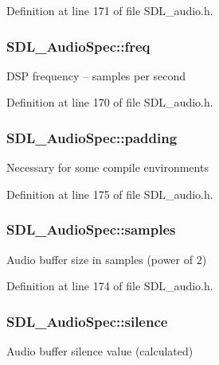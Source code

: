 Definition at line 171 of file S\-D\-L\-\_\-audio.\-h.

\hypertarget{struct_s_d_l___audio_spec_a8b823ce46fc2e448cf7e6fc141aff6b2}{
\subsubsection[{freq}]{ S\-D\-L\-\_\-\-Audio\-Spec\-::freq}}\label{struct_s_d_l___audio_spec_a8b823ce46fc2e448cf7e6fc141aff6b2}
D\-S\-P frequency -- samples per second 

Definition at line 170 of file S\-D\-L\-\_\-audio.\-h.

\hypertarget{struct_s_d_l___audio_spec_a738371fc13b54cefef4db16994abeeb6}{
\subsubsection[{padding}]{ S\-D\-L\-\_\-\-Audio\-Spec\-::padding}}\label{struct_s_d_l___audio_spec_a738371fc13b54cefef4db16994abeeb6}
Necessary for some compile environments 

Definition at line 175 of file S\-D\-L\-\_\-audio.\-h.

\hypertarget{struct_s_d_l___audio_spec_a2cdf5e885808c10bfa2810b706e69f95}{
\subsubsection[{samples}]{ S\-D\-L\-\_\-\-Audio\-Spec\-::samples}}\label{struct_s_d_l___audio_spec_a2cdf5e885808c10bfa2810b706e69f95}
Audio buffer size in samples (power of 2) 

Definition at line 174 of file S\-D\-L\-\_\-audio.\-h.

\hypertarget{struct_s_d_l___audio_spec_addc462c8a806e6c122eccf63482048f6}{
\subsubsection[{silence}]{ S\-D\-L\-\_\-\-Audio\-Spec\-::silence}}\label{struct_s_d_l___audio_spec_addc462c8a806e6c122eccf63482048f6}
Audio buffer silence value (calculated) 

